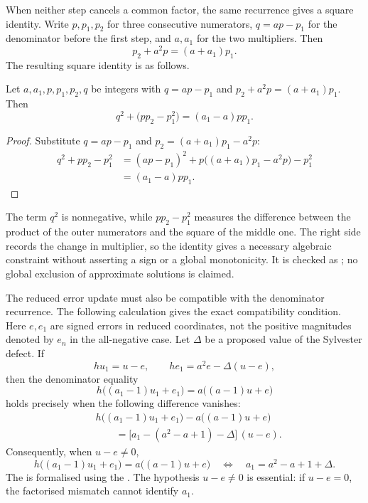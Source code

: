 \documentclass[11pt]{article}
\begin{document}
When neither step cancels a common factor, the same recurrence gives
a square identity. Write $p,p_1,p_2$ for three consecutive numerators,
$q=ap-p_1$ for the denominator before the first step, and $a,a_1$ for
the two multipliers. Then
\[
 p_2+a^2p=(a+a_1)p_1.
\]
The resulting square identity is as follows.

\begin{theorem}\label{long243:res:curvature}
Let $a,a_1,p,p_1,p_2,q$ be integers with $q=ap-p_1$ and
$p_2+a^2p=(a+a_1)p_1$.  Then
\[
 q^2+\bigl(pp_2-p_1^2\bigr)=(a_1-a)pp_1.
\]
\end{theorem}

\begin{proof}
Substitute $q=ap-p_1$ and $p_2=(a+a_1)p_1-a^2p$:
\[
 \begin{aligned}
 q^2+pp_2-p_1^2
 &=(ap-p_1)^2+p\bigl((a+a_1)p_1-a^2p\bigr)-p_1^2\\
 &=(a_1-a)pp_1.
 \end{aligned}
\]
\end{proof}

The term $q^2$ is nonnegative, while $pp_2-p_1^2$ measures the difference
between the product of the outer numerators and the square of the middle one.  The right side records the change in multiplier, so the
identity gives a necessary algebraic constraint without
asserting a sign or a global monotonicity.  It is checked as
; no global exclusion of approximate solutions is
claimed.

The reduced error update must also be compatible with the denominator
recurrence. The following calculation gives the exact compatibility
condition.
Here $e,e_1$ are signed errors in reduced coordinates, not the positive
magnitudes denoted by $e_n$ in the all-negative case. Let $\Delta$ be a
proposed value of the Sylvester defect. If
\[
 hu_1=u-e,
 \qquad he_1=a^2e-\Delta(u-e),
\]
then the denominator equality
\[
 h\bigl((a_1-1)u_1+e_1\bigr)
   =a\bigl((a-1)u+e\bigr)
\]
holds precisely when the following difference vanishes:
\[
 \begin{aligned}
 &h\bigl((a_1-1)u_1+e_1\bigr)-a\bigl((a-1)u+e\bigr)\\
 &\qquad=\bigl[a_1-(a^2-a+1)-\Delta\bigr]\,(u-e).
 \end{aligned}
\]
Consequently, when $u-e\ne0$,
\[
 h\bigl((a_1-1)u_1+e_1\bigr)
   =a\bigl((a-1)u+e\bigr)
 \quad\Longleftrightarrow\quad
 a_1=a^2-a+1+\Delta.
\]
The
is formalised using the
.  The hypothesis $u-e\ne0$ is essential: if
$u-e=0$, the factorised mismatch cannot identify $a_1$.
\end{document}
